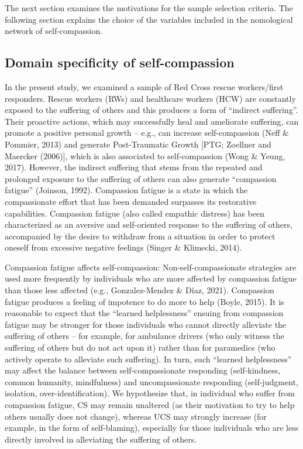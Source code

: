 \documentclass[
  man]{apa7}
\begin{document}
The next section examines the motivations for the sample selection criteria. The following section explains the choice of the variables included in the nomological network of self-compassion.

\hypertarget{domain-specificity-of-self-compassion}{%
\subsection{Domain specificity of self-compassion}\label{domain-specificity-of-self-compassion}}

In the present study, we examined a sample of Red Cross rescue workers/first responders. Rescue workers (RWs) and healthcare workers (HCW) are constantly exposed to the suffering of others and this produces a form of ``indirect suffering''. Their proactive actions, which may successfully heal and ameliorate suffering, can promote a positive personal growth -- e.g., can increase self-compassion (Neff \& Pommier, 2013) and generate Post-Traumatic Growth {[}PTG; Zoellner and Maercker (2006){]}, which is also associated to self-compassion (Wong \& Yeung, 2017). However, the indirect suffering that stems from the repeated and prolonged exposure to the suffering of others can also generate ``compassion fatigue'' (Joinson, 1992). Compassion fatigue is a state in which the compassionate effort that has been demanded surpasses its restorative capabilities. Compassion fatigue (also called empathic distress) has been characterized as an aversive and self-oriented response to the suffering of others, accompanied by the desire to withdraw from a situation in order to protect oneself from excessive negative feelings (Singer \& Klimecki, 2014).

Compassion fatigue affects self-compassion: Non-self-compassionate strategies are used more frequently by individuals who are more affected by compassion fatigue than those less affected (e.g., Gonzalez-Mendez \& Díaz, 2021). Compassion fatigue produces a feeling of impotence to do more to help (Boyle, 2015). It is reasonable to expect that the ``learned helplessness'' ensuing from compassion fatigue may be stronger for those individuals who cannot directly alleviate the suffering of others -- for example, for ambulance drivers (who only witness the suffering of others but do not act upon it) rather than for paramedics (who actively operate to alleviate such suffering). In turn, such ``learned helplessness'' may affect the balance between self-compassionate responding (self-kindness, common humanity, mindfulness) and uncompassionate responding (self-judgment, isolation, over-identification). We hypothesize that, in individual who suffer from compassion fatigue, CS may remain unaltered (as their motivation to try to help others usually does not change), whereas UCS may strongly increase (for example, in the form of self-blaming), especially for those individuals who are less directly involved in alleviating the suffering of others.
\end{document}
